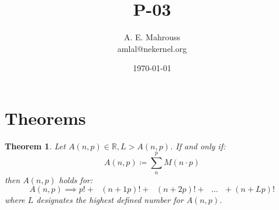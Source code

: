 \documentclass{article}
\title{P-03}
\author{A. E. Mahrouss\\amlal@nekernel.org}
\date{\today}
\theoremstyle{plain}
\newtheorem{theorem}{Theorem}[section]
\theoremstyle{definition}
\theoremstyle{remark}
\begin{document}
\maketitle

\section{Theorems}

\begin{theorem}
Let $A(n, p) \in \mathbb{R}, L > A(n, p)$. If and only if:
\begin{equation}
    A(n, p) \coloneq \sum_{n}^{p} M(n \cdot p)
\end{equation}
then $A(n, p)$ holds for:
\begin{equation}
    A(n, p) \implies p! + \text{ } (n+1p)! + \text{ } (n+2p)! + \text{ } \dots \text{ } + (n+Lp)! 
\end{equation}
where $L$ designates the highest defined number for $A(n, p)$.
\end{theorem}
\end{document}
